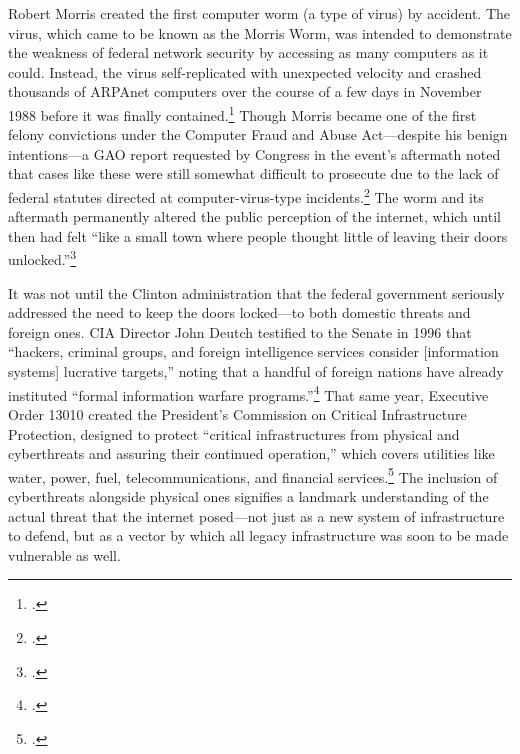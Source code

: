 \documentclass{memoir}
\begin{document}
\begin{refsegment}
Robert Morris created the first computer worm (a type of virus) by accident. The virus, which came to be known as the Morris Worm, was intended to demonstrate the weakness of federal network security by accessing as many computers as it could. Instead, the virus self-replicated with unexpected velocity and crashed thousands of ARPAnet computers over the course of a few days in November 1988 before it was finally contained.\footcite[This source, a master's thesis for the USAF Air University, makes the dramatic and completely unsubstantiated claim that the Morris worm infected half of of ARPAnet's 88,000 computers. The more popular (and plausible) claim is that of the roughly 60,000 ARPAnet-connected computers, the worm infected 10\% of them, though that number is not particularly well substantiated either.]{moore_conception_2014} Though Morris became one of the first felony convictions under the Computer Fraud and Abuse Act---despite his benign intentions---a GAO report requested by Congress in the event's aftermath noted that cases like these were still somewhat difficult to prosecute due to the lack of federal statutes directed at computer-virus-type incidents.\footcite{u._s._government_accounting_office_computer_1989} The worm and its aftermath permanently altered the public perception of the internet, which until then had felt ``like a small town where people thought little of leaving their doors unlocked.''\footcite{lee_how_2013}

It was not until the Clinton administration that the federal government seriously addressed the need to keep the doors locked---to both domestic threats and foreign ones. CIA Director John Deutch testified to the Senate in 1996 that ``hackers, criminal groups, and foreign intelligence services consider [information systems] lucrative targets,'' noting that a handful of foreign nations have already instituted ``formal information warfare programs.''\footcite{deutch_worldwide_1996} That same year, Executive Order 13010 created the President's Commission on Critical Infrastructure Protection, designed to protect ``critical infrastructures from physical and cyberthreats and assuring their continued operation,'' which covers utilities like water, power, fuel, telecommunications, and financial services.\footcite[~p.761]{boys_clinton_2018} The inclusion of cyberthreats alongside physical ones signifies a landmark understanding of the actual threat that the internet posed---not just as a new system of infrastructure to defend, but as a vector by which all legacy infrastructure was soon to be made vulnerable as well.


\end{refsegment}
\end{document}

